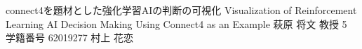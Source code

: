 \documentclass[final,a4j,12pt]{jreport}
\begin{document}
\begin{titlepage}
\thesis
{connect4を題材とした強化学習AIの判断の可視化}
{Visualization of Reinforcement Learning AI Decision Making Using Connect4 as an Example}
{萩原 将文 教授}
{5}
{学籍番号 62019277}
{村上 花恋}
\end{titlepage}

\contents










\newpage
\pagestyle{fancyplain}\lfoot{}\cfoot{\thepage}\rhead{}
\chead{} \rhead{}
\printbibliography[title=参考文献]

\appendix





\end{document}
